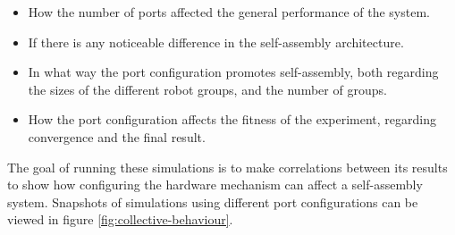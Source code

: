 \begin{itemize}
	\item How the number of ports affected the general performance of the system.
	\item If there is any noticeable difference in the self-assembly architecture.
	\item In what way the port configuration promotes self-assembly, both regarding the sizes of the different robot groups, and the number of groups.
	\item How the port configuration affects the fitness of the experiment, regarding convergence and the final result.
\end{itemize}

The goal of running these simulations is to make correlations between its results to show how configuring the hardware mechanism can affect a self-assembly system. Snapshots of simulations using different port configurations can be viewed in figure \ref{fig:collective-behaviour}.


